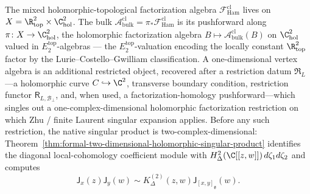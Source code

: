 \documentclass[11pt]{memoir}
\begin{document}
\begin{rmk}\label{rmk:native-bulk-object-c2}
  The mixed holomorphic-topological factorization algebra
  $\mathcal F^{\mathrm{cl}}_{\mathrm{Ham}}$ lives on
  $X=\R^2_{\mathrm{top}}\times\C^2_{\mathrm{hol}}$.  The bulk
  $\mathcal A^{\mathrm{cl}}_{\mathrm{bulk}}
   =\pi_*\mathcal F^{\mathrm{cl}}_{\mathrm{Ham}}$
  is its pushforward along $\pi\colon X\to\C^2_{\mathrm{hol}}$, the
  holomorphic factorization algebra
  \(B\mapsto\mathcal A^{\mathrm{cl}}_{\mathrm{bulk}}(B)\) on
  \(\C^2_{\mathrm{hol}}\) valued in \(E_2^{\mathrm{top}}\)-algebras --- the
  \(E_2^{\mathrm{top}}\)-valuation encoding the locally constant \(\R^2_{\mathrm{top}}\)
  factor by the Lurie--Costello--Gwilliam classification.  A
  one-dimensional vertex algebra is an additional restricted object,
  recovered
  after a restriction datum \(\mathfrak R_L\)---a holomorphic curve
  \(C\hookrightarrow\C^2\), transverse boundary condition, restriction
  functor \(\mathsf R_{L,\mathcal B_\perp}\), and, when used, a
  factorization-homology pushforward---which singles out a
  one-complex-dimensional holomorphic factorization restriction on
  which Zhu / finite Laurent singular expansion applies.  Before any such restriction,
  the native singular product is two-complex-dimensional:
  Theorem~\ref{thm:formal-two-dimensional-holomorphic-singular-product} identifies
  the diagonal local-cohomology coefficient module with
  \(H^2_\Delta(\C[[z,w]])\,d\zeta_1d\zeta_2\) and computes
  \[
    \mathsf{J}_x(z)\mathsf{J}_y(w)
    \sim
    K^{(2)}_\Delta(z,w)\mathsf{J}_{[x,y]_{\mathfrak g}}(w).
  \]
\end{rmk}
\end{document}
